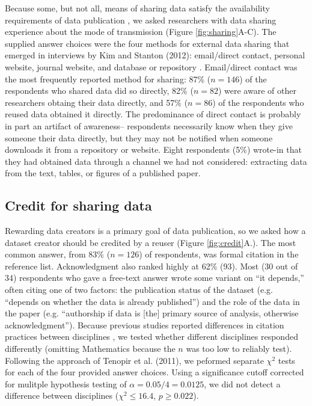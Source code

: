 \documentclass[10pt]{article}
\begin{document}
Because some, but not all, means of sharing data satisfy the availability requirements of data publication \cite{kratz_data_2014}, we asked researchers with data sharing experience about the mode of transmission (Figure \ref{fig:sharing}A-C).
The supplied answer choices were the four methods for external data sharing that emerged in interviews by Kim and Stanton (2012): email/direct contact, personal website, journal website, and database or repository \cite{kim_institutional_2012}.
Email/direct contact was the most frequently reported method for sharing: 87\% ($n=146$) of the respondents who shared data did so directly, 82\% ($n=82$) were aware of other researchers obtaing their data directly, and 57\% ($n=86$) of the respondents who reused data obtained it directly.
The predominance of direct contact is probably in part an artifact of awareness– respondents necessarily know when they give someone their data directly, but they may not be notified when someone downloads it from a repository or website.
Eight respondents (5\%) wrote-in that they had obtained data through a channel we had not considered: extracting data from the text, tables, or figures of a published paper.


\subsection*{Credit for sharing data}

Rewarding data creators is a primary goal of data publication, so we asked how a dataset creator should be credited by a reuser (Figure \ref{fig:credit}A.).
The most common answer, from 83\% ($n=126$) of respondents, was formal citation in the reference list.
Acknowledgment also ranked highly at 62\% (93).
Most (30 out of 34) respondents who gave a free-text answer wrote some variant on ``it depends,'' often citing one of two factors: the publication status of the dataset (e.g. ``depends on whether the data is already published'') and the role of the data in the paper (e.g. ``authorship if data is [the] primary source of analysis, otherwise acknowledgment'').
Because previous studies reported differences in citation practices between disciplines \cite{swan_share_2008, harley_assessing_2010, tenopir_data_2011}, we tested whether different disciplines responded differently (omitting Mathematics because the $n$ was too low to reliably test). Following the approach of Tenopir et al. (2011), we peformed separate $\chi^{2}$ tests for each of the four provided answer choices. Using a significance cutoff corrected for mulitple hypothesis testing of $\alpha= 0.05/4 = 0.0125$, we did not detect a difference between disciplines ($\chi^{2}\leq 16.4$, $p\geq 0.022$).
\end{document}
